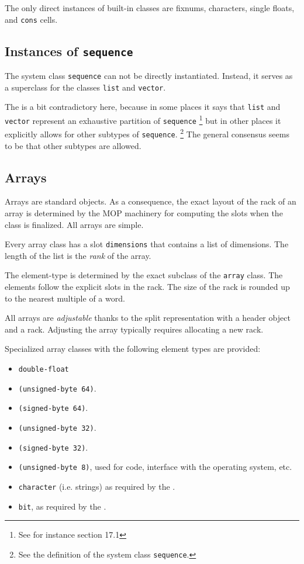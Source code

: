 The only direct instances of built-in classes are fixnums, characters,
single floats, and \texttt{cons} cells.

\subsection{Instances of \texttt{sequence}}

The system class \texttt{sequence} can not be directly instantiated.
Instead, it serves as a superclass for the classes \texttt{list} and
\texttt{vector}.

The \hs{} is a bit contradictory here, because
in some places it says that \texttt{list} and \texttt{vector}
represent an exhaustive partition of \texttt{sequence}%
\footnote{See for instance section 17.1}
but in other places it explicitly allows for other subtypes of
\texttt{sequence}.%
\footnote{See the definition of the system class \texttt{sequence}.}
The general consensus seems to be that other subtypes are allowed.

\subsection{Arrays}
\label{sec-data-representation-arrays}

Arrays are standard objects.  As a consequence, the exact layout of
the rack of an array is determined by the MOP machinery for computing
the slots when the class is finalized.  All arrays are simple.

Every array class has a slot \texttt{dimensions} that contains a list
of dimensions.  The length of the list is the \emph{rank} of the
array.

The element-type is determined by the exact subclass of the
\texttt{array} class.  The elements follow the explicit slots in the
rack.  The size of the rack is rounded up to the nearest multiple of a
word.

All arrays are \emph{adjustable} thanks to the split representation
with a header object and a rack.  Adjusting the array
typically requires allocating a new rack.

Specialized array classes with the following element types are
provided:

\begin{itemize}
\item \texttt{double-float}
\item \texttt{(unsigned-byte 64)}.
\item \texttt{(signed-byte 64)}.
\item \texttt{(unsigned-byte 32)}.
\item \texttt{(signed-byte 32)}.
\item \texttt{(unsigned-byte 8)}, used for code, interface with the
  operating system, etc.
\item \texttt{character} (i.e. strings) as required by the \hs{}.
\item \texttt{bit}, as required by the \hs{}.
\end{itemize}

